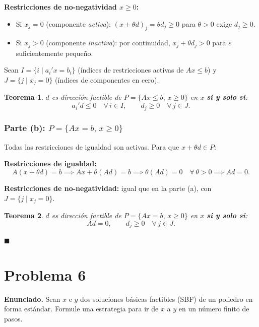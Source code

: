 \documentclass{article}
\newtheorem*{teo}{Teorema}
\begin{document}
\textbf{Restricciones de no-negatividad $x \geq 0$:}
\begin{itemize}
  \item Si $x_j = 0$ (componente \emph{activa}): $(x + \theta d)_j = \theta d_j \geq 0$ para $\theta > 0$ exige $d_j \geq 0$.
  \item Si $x_j > 0$ (componente \emph{inactiva}): por continuidad, $x_j + \theta d_j > 0$ para $\varepsilon$ suficientemente pequeño.
\end{itemize}

Sean $I = \{i \mid a_i'x = b_i\}$ (índices de restricciones activas de $Ax \leq b$) y $J = \{j \mid x_j = 0\}$ (índices de componentes en cero).

\begin{teo}
$d$ es dirección factible de $P = \{Ax \leq b,\, x \geq 0\}$ en $x$ \textbf{si y solo si}:
\[
  a_i'd \leq 0 \quad \forall\, i \in I, \qquad d_j \geq 0 \quad \forall\, j \in J.
\]
\end{teo}

\subsubsection*{Parte (b): $P = \{Ax = b,\, x \geq 0\}$}

Todas las restricciones de igualdad son activas. Para que $x + \theta d \in P$:

\textbf{Restricciones de igualdad:}
\[
  A(x + \theta d) = b \implies Ax + \theta(Ad) = b \implies \theta(Ad) = 0 \quad \forall\, \theta > 0 \implies Ad = 0.
\]

\textbf{Restricciones de no-negatividad:} igual que en la parte (a), con $J = \{j \mid x_j = 0\}$.

\begin{teo}
$d$ es dirección factible de $P = \{Ax = b,\, x \geq 0\}$ en $x$ \textbf{si y solo si}:
\[
  Ad = 0, \qquad d_j \geq 0 \quad \forall\, j \in J.
\]
\end{teo}

$\blacksquare$

\section*{Problema 6}

\textbf{Enunciado.} Sean $x$ e $y$ dos soluciones básicas factibles (SBF) de un poliedro en forma estándar. Formule una estrategia para ir de $x$ a $y$ en un número finito de pasos.
\end{document}
